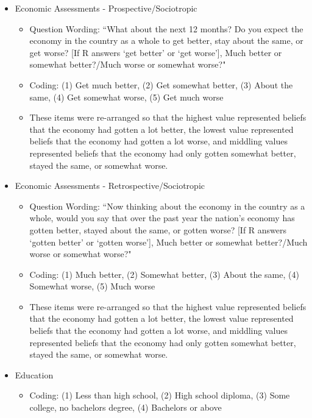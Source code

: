 \documentclass[12pt]{article}
\begin{document}
\begin{appendices}
\begin{refsection}
\begin{itemize}
	\item Economic Assessments - Prospective/Sociotropic
		\begin{itemize}
			\item Question Wording: ``What about the next 12 months? Do you expect the economy in the country as a whole to get better, stay about the same, or get worse? [If R answers `get better' or `get worse'], Much better or somewhat better?/Much worse or somewhat worse?"
			\item Coding: (1) Get much better, (2) Get somewhat better, (3) About the same, (4) Get somewhat worse, (5) Get much worse
			\item These items were re-arranged so that the highest value represented beliefs that the economy had gotten a lot better, the lowest value represented beliefs that the economy had gotten a lot worse, and middling values represented beliefs that the economy had only gotten somewhat better, stayed the same, or somewhat worse. 
		\end{itemize}	
						
	\item Economic Assessments - Retrospective/Sociotropic
		\begin{itemize}
			\item Question Wording: ``Now thinking about the economy in the country as a whole, would you say that over the past year the nation's economy has gotten better, stayed about the same, or gotten worse? [If R answers `gotten better' or `gotten worse'], Much better or somewhat better?/Much worse or somewhat worse?"
			\item Coding: (1) Much better, (2) Somewhat better, (3) About the same, (4) Somewhat worse, (5) Much worse
			\item These items were re-arranged so that the highest value represented beliefs that the economy had gotten a lot better, the lowest value represented beliefs that the economy had gotten a lot worse, and middling values represented beliefs that the economy had only gotten somewhat better, stayed the same, or somewhat worse. 
		\end{itemize}
		
	\item Education
		\begin{itemize}
			\item Coding: (1) Less than high school, (2) High school diploma, (3) Some college, no bachelors degree, (4) Bachelors or above
		\end{itemize}
		

\end{itemize}
\end{refsection}
\end{appendices}
\end{document}
